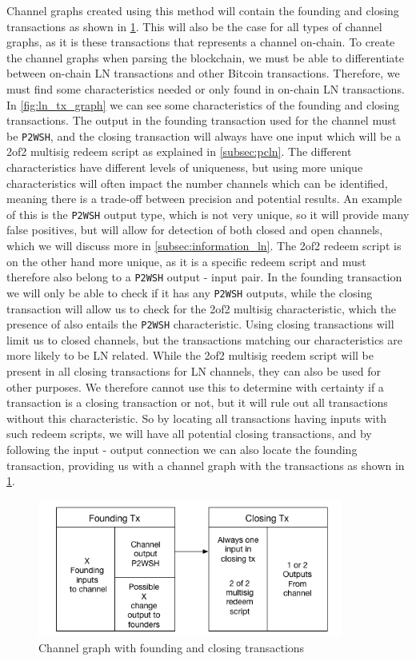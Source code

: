 Channel graphs created using this method will contain the founding and closing transactions as shown in \cref{fig:ln_tx_graph_small}.
This will also be the case for all types of channel graphs, as it is these transactions that represents a channel on-chain.
To create the channel graphs when parsing the blockchain, we must be able to differentiate between on-chain LN transactions and other Bitcoin transactions. Therefore, we must find some characteristics needed or only found in on-chain LN transactions. 
In \cref{fig:ln_tx_graph} we can see some characteristics of the founding and closing transactions.
The output in the founding transaction used for the channel must be {\tt P2WSH}, and the closing transaction will always have one input which will be a 2of2 multisig redeem script as explained in \cref{subsec:pcln}. The different characteristics have different levels of uniqueness, but using more unique characteristics will often impact the number channels which can be identified, meaning there is a trade-off between precision and potential results. An example of this is the {\tt P2WSH} output type, which is not very unique, so it will provide many false positives, but will allow for detection of both closed and open channels, which we will discuss more in \cref{subsec:information_ln}. 
The 2of2 redeem script is on the other hand more unique, as it is a specific redeem script and must therefore also belong to a {\tt P2WSH} output - input pair. In the founding transaction we will only be able to check if it has any {\tt P2WSH} outputs, while the closing transaction will allow us to check for the 2of2 multisig characteristic, which the presence of also entails the {\tt P2WSH} characteristic.
Using closing transactions will limit us to closed channels, but the transactions matching our characteristics are more likely to be LN related. While the 2of2 multisig reedem script will be present in all closing transactions for LN channels, they can also be used for other purposes. We therefore cannot use this to determine with certainty if a transaction is a closing transaction or not, but it will rule out all transactions without this characteristic. So by locating all transactions having inputs with such redeem scripts, we will have all potential closing transactions, and by following the input - output connection we can also locate the founding transaction, providing us with a channel graph with the transactions as shown in \cref{fig:ln_tx_graph_small}.

\begin{figure}[h]
    \centering
    \includegraphics[width=10cm]{figures/ln_tx_graph_small.png}
    \caption{Channel graph with founding and closing transactions}
    \label{fig:ln_tx_graph_small}
\end{figure}

